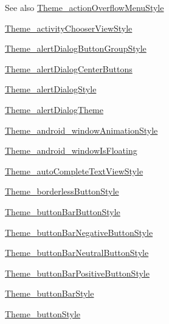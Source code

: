 \begin{DoxySeeAlso}{See also}
\hyperlink{classcheck_1_1test_1_1_r_1_1styleable_a56ea39fe4c79a7e03d3181b96f1995f3}{Theme\+\_\+action\+Overflow\+Menu\+Style} 

\hyperlink{classcheck_1_1test_1_1_r_1_1styleable_a5df6cc2d9245f0001ee13f7cb5b95869}{Theme\+\_\+activity\+Chooser\+View\+Style} 

\hyperlink{classcheck_1_1test_1_1_r_1_1styleable_acba96b3fbc00ef03937429054fbe3036}{Theme\+\_\+alert\+Dialog\+Button\+Group\+Style} 

\hyperlink{classcheck_1_1test_1_1_r_1_1styleable_a11c37dcf3c6bf471d394d417c9aaa633}{Theme\+\_\+alert\+Dialog\+Center\+Buttons} 

\hyperlink{classcheck_1_1test_1_1_r_1_1styleable_ab1ac7d03d2b00801128e1263f5826e5c}{Theme\+\_\+alert\+Dialog\+Style} 

\hyperlink{classcheck_1_1test_1_1_r_1_1styleable_ac9de00117911739b0431126a81b708d4}{Theme\+\_\+alert\+Dialog\+Theme} 

\hyperlink{classcheck_1_1test_1_1_r_1_1styleable_af787bd8d14167f831eaf83cd8fc2098e}{Theme\+\_\+android\+\_\+window\+Animation\+Style} 

\hyperlink{classcheck_1_1test_1_1_r_1_1styleable_a08050f289331059420ffd439bcbc10e8}{Theme\+\_\+android\+\_\+window\+Is\+Floating} 

\hyperlink{classcheck_1_1test_1_1_r_1_1styleable_a2e1e6f06dba491f9e8aa0916badaeee8}{Theme\+\_\+auto\+Complete\+Text\+View\+Style} 

\hyperlink{classcheck_1_1test_1_1_r_1_1styleable_a12279ad7c3b04030bd65962776fcef88}{Theme\+\_\+borderless\+Button\+Style} 

\hyperlink{classcheck_1_1test_1_1_r_1_1styleable_afeba9266742fb85f098bb860e221c453}{Theme\+\_\+button\+Bar\+Button\+Style} 

\hyperlink{classcheck_1_1test_1_1_r_1_1styleable_aaf6d54b7d21dd82c42f35041e1ce1c92}{Theme\+\_\+button\+Bar\+Negative\+Button\+Style} 

\hyperlink{classcheck_1_1test_1_1_r_1_1styleable_a18a041fde9f2407a8e18b1c7a357e426}{Theme\+\_\+button\+Bar\+Neutral\+Button\+Style} 

\hyperlink{classcheck_1_1test_1_1_r_1_1styleable_ac2ac7678c2fe6e4ec90fbff60457ded3}{Theme\+\_\+button\+Bar\+Positive\+Button\+Style} 

\hyperlink{classcheck_1_1test_1_1_r_1_1styleable_aef00ad24e719805177672c1be58ab494}{Theme\+\_\+button\+Bar\+Style} 

\hyperlink{classcheck_1_1test_1_1_r_1_1styleable_af32f3514cf5d1f07163a1a7b6adf5022}{Theme\+\_\+button\+Style} 


\end{DoxySeeAlso}
